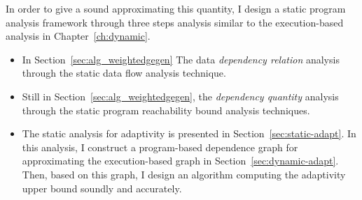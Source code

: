 In order to give a sound approximating this quantity, I design a static program analysis framework through three steps analysis
similar to the execution-based analysis in Chapter~\ref{ch:dynamic}.
\begin{itemize}
   \item In Section~\ref{sec:alg_weightedgegen}
   The data \emph{dependency relation} analysis through the static data flow analysis technique.
   \item Still in Section~\ref{sec:alg_weightedgegen}, the \emph{dependency quantity} analysis through the static program reachability bound analysis techniques.
   \item The static analysis for adaptivity is presented in Section~\ref{sec:static-adapt}.
   In this analysis, I construct a program-based dependence graph for approximating the execution-based graph in Section~\ref{sec:dynamic-adapt}.
   Then, based on this graph, I design an algorithm
   computing the adaptivity upper bound soundly 
   and accurately.
   \end{itemize}